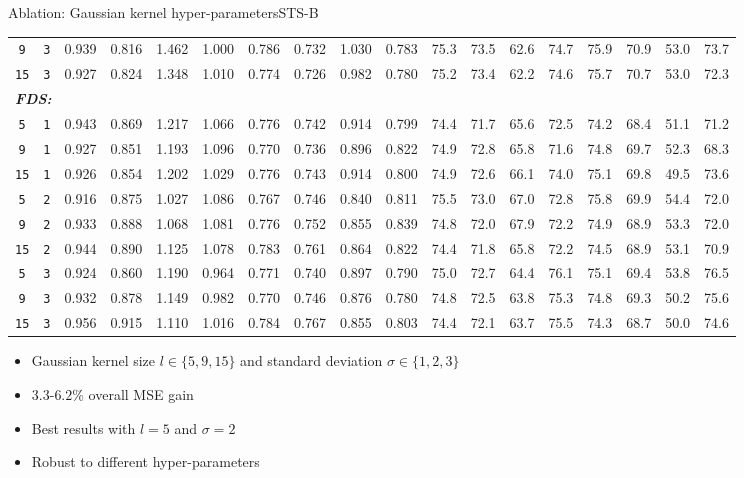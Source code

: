 \begin{frame}{Ablation: Gaussian kernel hyper-parameters}{STS-B}
\begin{table}[H]
\begin{center}
{\begin{tabular}{c|c|cccc|cccc|cccc|cccc}
					\texttt{9}&\texttt{3} & 0.939 & 0.816 & 1.462 & 1.000 & 0.786 & 0.732 & 1.030 & 0.783 & 75.3 & 73.5 & 62.6 & 74.7 & 75.9 & 70.9 & 53.0 & 73.7  \\[1.2pt]
					\texttt{15}&\texttt{3} & 0.927 & 0.824 & 1.348 & 1.010 & 0.774 & 0.726 & 0.982 & 0.780 & 75.2 & 73.4 & 62.2 & 74.6 & 75.7 & 70.7 & 53.0 & 72.3 \\ \midrule\midrule
					\multicolumn{9}{l}{\emph{\textbf{FDS:}}} \\ \midrule
					\texttt{5}&\texttt{1}   & 0.943 & 0.869 & 1.217 & 1.066 & 0.776 & 0.742 & 0.914 & 0.799 & 74.4 & 71.7 & 65.6 & 72.5 & 74.2 & 68.4 & 51.1 & 71.2 \\[1.2pt]
					\texttt{9}&\texttt{1} & 0.927 & 0.851 & 1.193 & 1.096 & 0.770 & 0.736 & 0.896 & 0.822 & 74.9 & 72.8 & 65.8 & 71.6 & 74.8 & 69.7 & 52.3 & 68.3  \\[1.2pt]
					\texttt{15}&\texttt{1} & 0.926 & 0.854 & 1.202 & 1.029 & 0.776 & 0.743 & 0.914 & 0.800 & 74.9 & 72.6 & 66.1 & 74.0 & 75.1 & 69.8 & 49.5 & 73.6 \\[1.2pt] 
					\texttt{5}&\texttt{2}   & 0.916 & 0.875 & 1.027 & 1.086 & 0.767 & 0.746 & 0.840 & 0.811 & 75.5 & 73.0 & 67.0 & 72.8 & 75.8 & 69.9 & 54.4 & 72.0 \\[1.2pt]
					\texttt{9}&\texttt{2} & 0.933 & 0.888 & 1.068 & 1.081 & 0.776 & 0.752 & 0.855 & 0.839 & 74.8 & 72.0 & 67.9 & 72.2 & 74.9 & 68.9 & 53.3 & 72.0  \\[1.2pt]
					\texttt{15}&\texttt{2} & 0.944 & 0.890 & 1.125 & 1.078 & 0.783 & 0.761 & 0.864 & 0.822 & 74.4 & 71.8 & 65.8 & 72.2 & 74.5 & 68.9 & 53.1 & 70.9 \\[1.2pt]
					\texttt{5}&\texttt{3}   & 0.924 & 0.860 & 1.190 & 0.964 & 0.771 & 0.740 & 0.897 & 0.790 & 75.0 & 72.7 & 64.4 & 76.1 & 75.1 & 69.4 & 53.8 & 76.5 \\[1.2pt]
					\texttt{9}&\texttt{3} & 0.932 & 0.878 & 1.149 & 0.982 & 0.770 & 0.746 & 0.876 & 0.780 & 74.8 & 72.5 & 63.8 & 75.3 & 74.8 & 69.3 & 50.2 & 75.6  \\[1.2pt]
					\texttt{15}&\texttt{3} & 0.956 & 0.915 & 1.110 & 1.016 & 0.784 & 0.767 & 0.855 & 0.803 & 74.4 & 72.1 & 63.7 & 75.5 & 74.3 & 68.7 & 50.0 & 74.6 \\
					\bottomrule[1.5pt]
				\end{tabular}
			}
		\end{center}
	\end{table}
	\begin{itemize}
		\item Gaussian kernel size $l\in\{5,9,15\}$ and standard deviation $\sigma\in\{1,2,3\}$
		\item $3.3$-$6.2\%$ overall MSE gain
		\item Best results with $l=5$ and $\sigma=2$
		\item Robust to different hyper-parameters
	\end{itemize}
\end{frame}

